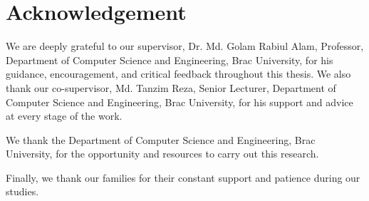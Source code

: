 \section*{Acknowledgement}
We are deeply grateful to our supervisor, Dr. Md. Golam Rabiul Alam, Professor, Department of Computer Science and Engineering, Brac University, for his guidance, encouragement, and critical feedback throughout this thesis. We also thank our co-supervisor, Md. Tanzim Reza, Senior Lecturer, Department of Computer Science and Engineering, Brac University, for his support and advice at every stage of the work.

We thank the Department of Computer Science and Engineering, Brac University, for the opportunity and resources to carry out this research.

Finally, we thank our families for their constant support and patience during our studies.
\pagebreak
